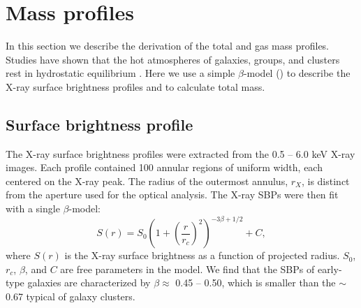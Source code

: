 \documentclass[iop]{emulateapj}
\begin{document}
\section{Mass profiles}\label{sec_mass}

In this section we describe the derivation of the total and gas mass profiles. Studies have shown that the hot atmospheres of galaxies, groups, and clusters rest in hydrostatic equilibrium \citep{Moore:94, Churazov:08, Churazov:10, Navarro:10, Babyk:14, Babyk:16}. Here we use a simple $\beta$-model (\citealt{Cavaliere:78}) to describe the X-ray surface brightness profiles and to calculate total mass. 

\subsection{Surface brightness profile}

The X-ray surface brightness profiles were extracted from the 0.5 -- 6.0 keV X-ray images. Each profile contained 100 annular regions of uniform width, each centered on the X-ray peak. The radius of the outermost annulus, $r_X$, is distinct from the aperture used for the optical analysis. The X-ray SBPs were then fit with a single $\beta$-model:
\begin{equation}
S(r) = S_{0} \left( 1 + \left( \frac{r}{r_{c}}\right)^{2}\right)^{-3\beta + 1/2} + C,
\label{sr}
\end{equation}
where $S(r)$ is the X-ray surface brightness as a function of projected radius. $S_{0}$, $r_{c}$, $\beta$, and $C$ are free parameters in the model. We find that the SBPs of early-type galaxies are characterized by $\beta \approx$ 0.45 -- 0.50, which is smaller than the $\sim$ 0.67 typical of galaxy clusters.
\end{document}
